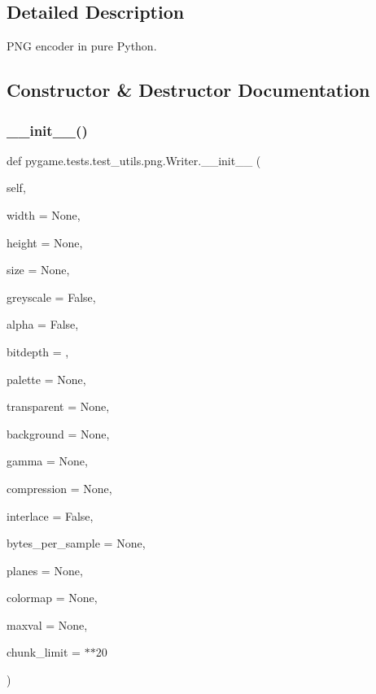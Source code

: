 \subsection{Detailed Description}
\begin{DoxyVerb}PNG encoder in pure Python.
\end{DoxyVerb}
 

\subsection{Constructor \& Destructor Documentation}
\mbox{\label{classpygame_1_1tests_1_1test__utils_1_1png_1_1_writer_a9716e895bd87428666ac22f3326d62e5}} 
\subsubsection{\texorpdfstring{\+\_\+\+\_\+init\+\_\+\+\_\+()}{\_\_init\_\_()}}
{\footnotesize\ttfamily def pygame.\+tests.\+test\+\_\+utils.\+png.\+Writer.\+\_\+\+\_\+init\+\_\+\+\_\+ (\begin{DoxyParamCaption}\item[{}]{self,  }\item[{}]{width = {\ttfamily None},  }\item[{}]{height = {\ttfamily None},  }\item[{}]{size = {\ttfamily None},  }\item[{}]{greyscale = {\ttfamily False},  }\item[{}]{alpha = {\ttfamily False},  }\item[{}]{bitdepth = {},  }\item[{}]{palette = {\ttfamily None},  }\item[{}]{transparent = {\ttfamily None},  }\item[{}]{background = {\ttfamily None},  }\item[{}]{gamma = {\ttfamily None},  }\item[{}]{compression = {\ttfamily None},  }\item[{}]{interlace = {\ttfamily False},  }\item[{}]{bytes\+\_\+per\+\_\+sample = {\ttfamily None},  }\item[{}]{planes = {\ttfamily None},  }\item[{}]{colormap = {\ttfamily None},  }\item[{}]{maxval = {\ttfamily None},  }\item[{}]{chunk\+\_\+limit = {$\ast$$\ast$20} }\end{DoxyParamCaption})}

